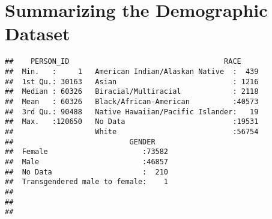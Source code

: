 \documentclass[]{article}
\newenvironment{Shaded}{\begin{snugshade}}{\end{snugshade}}
\newcommand{\KeywordTok}[1]{\textcolor[rgb]{0.13,0.29,0.53}{\textbf{#1}}}
\newcommand{\DataTypeTok}[1]{\textcolor[rgb]{0.13,0.29,0.53}{#1}}
\newcommand{\DecValTok}[1]{\textcolor[rgb]{0.00,0.00,0.81}{#1}}
\newcommand{\StringTok}[1]{\textcolor[rgb]{0.31,0.60,0.02}{#1}}
\newcommand{\CommentTok}[1]{\textcolor[rgb]{0.56,0.35,0.01}{\textit{#1}}}
\newcommand{\OperatorTok}[1]{\textcolor[rgb]{0.81,0.36,0.00}{\textbf{#1}}}
\newcommand{\NormalTok}[1]{#1}
\begin{document}
\begin{Shaded}
\end{Shaded}

\section{Summarizing the Demographic
Dataset}\label{summarizing-the-demographic-dataset}

\begin{Shaded}
\end{Shaded}

\begin{verbatim}
##    PERSON_ID                                    RACE      
##  Min.   :     1   American Indian/Alaskan Native  :  439  
##  1st Qu.: 30163   Asian                           : 1216  
##  Median : 60326   Biracial/Multiracial            : 2118  
##  Mean   : 60326   Black/African-American          :40573  
##  3rd Qu.: 90488   Native Hawaiian/Pacific Islander:   19  
##  Max.   :120650   No Data                         :19531  
##                   White                           :56754  
##                           GENDER     
##  Female                      :73582  
##  Male                        :46857  
##  No Data                     :  210  
##  Transgendered male to female:    1  
##                                      
##                                      
## 
\end{verbatim}
\end{document}
